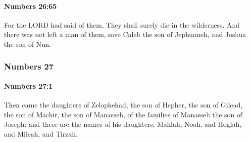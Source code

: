 		\paragraph{Numbers 26:65} %
			\label{NUMBERS-26-65}

			For the LORD had said of them, They shall surely die in the wilderness. And there was not left a man of them, save Caleb the son of Jephunneh, and Joshua the son of Nun.

	\subsubsection{Numbers 27} %
		\label{NUMBERS-27}

		\paragraph{Numbers 27:1} %
			\label{NUMBERS-27-1}

			Then came the daughters of Zelophehad, the son of Hepher, the son of Gilead, the son of Machir, the son of Manasseh, of the families of Manasseh the son of Joseph: and these are the names of his daughters; Mahlah, Noah, and Hoglah, and Milcah, and Tirzah.

